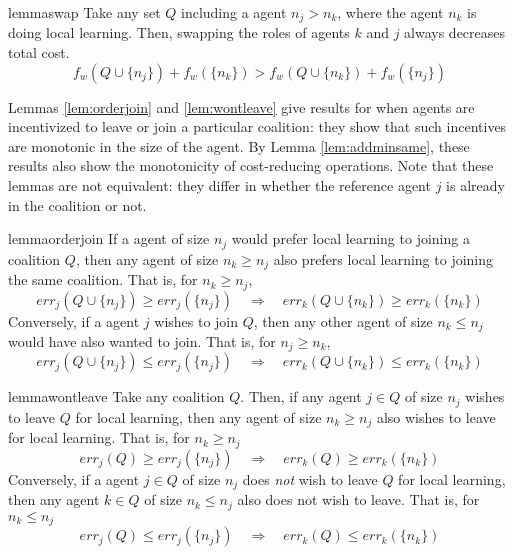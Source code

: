 \documentclass{article}
\newcommand{\ndraw}[0]{\ensuremath{n}}
\newcommand{\costw}[0]{\ensuremath{f_w}}
\begin{document}
\begin{restatable}[Swapping]{lemma}{swap}
\label{lem:swap}
Take any set $Q$ including a agent $\ndraw_j> \ndraw_k$, where the agent $\ndraw_k$ is doing local learning. Then, swapping the roles of agents $k$ and $j$ always decreases total cost. 
$$\costw(Q \cup \{\ndraw_j\}) + \costw(\{\ndraw_k\}) >\costw(Q \cup \{\ndraw_k\}) + \costw(\{\ndraw_j\})  $$
\end{restatable}

Lemmas \ref{lem:orderjoin} and \ref{lem:wontleave} give results for when agents are incentivized to leave or join a particular coalition: they show that such incentives are monotonic in the size of the agent. By Lemma \ref{lem:addminsame}, these results also show the monotonicity of cost-reducing operations. Note that these lemmas are not equivalent: they differ in whether the reference agent $j$ is already in the coalition or not. 

\begin{restatable}{lemma}{orderjoin}
\label{lem:orderjoin}
If a agent of size $\ndraw_j$ would prefer local learning to joining a coalition $Q$, then any agent of size $\ndraw_k \geq \ndraw_j$ also prefers local learning to joining the same coalition. That is, for $\ndraw_k \geq \ndraw_j$,
$$err_j(Q\cup \{\ndraw_j\}) \geq err_j(\{\ndraw_j\}) \quad \Rightarrow \quad err_k(Q \cup \{\ndraw_k\}) \geq err_k(\{\ndraw_k\}) $$
Conversely, if a agent $j$ wishes to join $Q$, then any other agent of size $\ndraw_k \leq \ndraw_j$ would have also wanted to join. That is, for $\ndraw_j \geq \ndraw_k$, 
$$err_j(Q\cup \{\ndraw_j\}) \leq err_j(\{\ndraw_j\}) \quad \Rightarrow \quad err_k(Q \cup \{\ndraw_k\}) \leq err_k(\{\ndraw_k\}) $$
\end{restatable}


\begin{restatable}{lemma}{wontleave}
\label{lem:wontleave}
Take any coalition $Q$. Then, if any agent $j \in Q$ of size $\ndraw_j$ wishes to leave $Q$ for local learning, then any agent of size $\ndraw_k \geq \ndraw_j$ also wishes to leave for local learning. That is, for $\ndraw_k \geq \ndraw_j$
$$err_j(Q) \geq err_j(\{\ndraw_j\}) \quad \Rightarrow \quad err_k(Q) \geq err_k(\{\ndraw_k\})$$
Conversely, if a agent $j \in Q$ of size $\ndraw_j$ does \emph{not} wish to leave $Q$ for local learning, then any agent $k \in Q$ of size $\ndraw_k \leq \ndraw_j$ also does not wish to leave. That is, for $\ndraw_k \leq \ndraw_j$
$$err_j(Q) \leq err_j(\{\ndraw_j\}) \quad \Rightarrow \quad err_k(Q) \leq err_k(\{\ndraw_k\})$$
\end{restatable}
\end{document}

